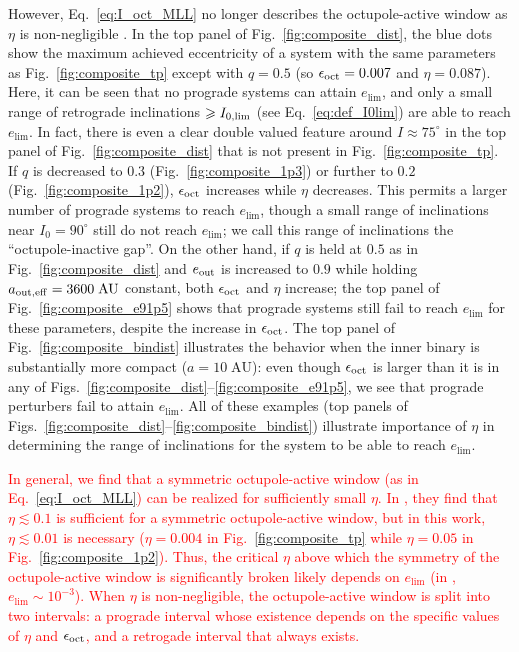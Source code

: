 \documentclass[
        fleqn,
        usenatbib,
    ]{mnras}
\begin{document}
However, Eq.~\eqref{eq:I_oct_MLL} no longer describes the octupole-active window
as $\eta$ is non-negligible \citep[see also][]{rodet_inprep}. In the top panel
of Fig.~\ref{fig:composite_dist}, the blue dots show the maximum achieved
eccentricity of a system with the same parameters as Fig.~\ref{fig:composite_tp}
except with $q = 0.5$ (so $\epsilon_{\rm oct} = 0.007$ and $\eta = 0.087$).
Here, it can be seen that no prograde systems can attain $e_{\lim}$, and only a
small range of retrograde inclinations $\geq I_{\rm 0, \lim}$ (see
Eq.~\ref{eq:def_I0lim}) are able to reach $e_{\lim}$. In fact, there is even a
clear double valued feature around $I \approx 75^\circ$ in the top panel of
Fig.~\ref{fig:composite_dist} that is not present in
Fig.~\ref{fig:composite_tp}. If $q$ is decreased to $0.3$
(Fig.~\ref{fig:composite_1p3}) or further to $0.2$
(Fig.~\ref{fig:composite_1p2}), $\epsilon_{\rm oct}$ increases while $\eta$
decreases. This permits a larger number of prograde systems to reach $e_{\lim}$,
though a small range of inclinations near $I_0 = 90^\circ$ still do not reach
$e_{\lim}$; we call this range of inclinations the ``octupole-inactive gap''. On
the other hand, if $q$ is held at $0.5$ as in Fig.~\ref{fig:composite_dist} and
$e_{\rm out}$ is increased to $0.9$ while holding $a_{\rm out, eff} =
3600\;\mathrm{AU}$ constant, both $\epsilon_{\rm oct}$ and $\eta$ increase; the
top panel of Fig.~\ref{fig:composite_e91p5} shows that prograde systems still
fail to reach $e_{\lim}$ for these parameters, despite the increase in
$\epsilon_{\rm oct}$. The top panel of Fig.~\ref{fig:composite_bindist}
illustrates the behavior when the inner binary is substantially more compact ($a
= 10\;\mathrm{AU}$): even though $\epsilon_{\rm oct}$ is larger than it is
in any of Figs.~\ref{fig:composite_dist}--\ref{fig:composite_e91p5}, we
see that prograde perturbers fail to attain $e_{\lim}$. All of these examples
(top panels of Figs.~\ref{fig:composite_dist}--\ref{fig:composite_bindist})
illustrate importance of $\eta$ in determining the range of inclinations for the
system to be able to reach $e_{\lim}$.

\textcolor{red}{In general, we find that a symmetric octupole-active window (as
in Eq.~\ref{eq:I_oct_MLL}) can be realized for sufficiently small $\eta$. In
\citet{rodet_inprep}, they find that $\eta \lesssim 0.1$ is sufficient for a
symmetric octupole-active window, but in this work, $\eta \lesssim 0.01$ is
necessary ($\eta = 0.004$ in Fig.~\ref{fig:composite_tp} while $\eta = 0.05$ in
Fig.~\ref{fig:composite_1p2}). Thus, the critical $\eta$ above which the
symmetry of the octupole-active window is significantly broken likely depends on
$e_{\lim}$ (in \citet{rodet_inprep}, $e_{\lim} \sim 10^{-3}$). When $\eta$ is
non-negligible, the octupole-active window is split into two intervals: a
prograde interval whose existence depends on the specific values of $\eta$ and
$\epsilon_{\rm oct}$, and a retrogade interval that always exists.}
\end{document}
